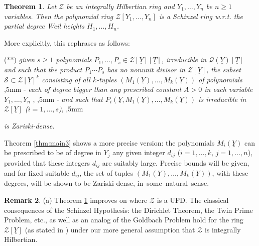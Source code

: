 \documentclass[11pt,a4paper,reqno]{amsart}
\def\Z{\mathbb{Z}}
\newtheorem{thm}{Theorem}[section]
\theoremstyle{definition}
\newtheorem{rmk}[thm]{Remark}
\begin{document}
{\begin{thm} \label{thm:schinzel-main}
Let ${\mathcal Z}$ be an integrally Hilbertian ring and $Y_1,\ldots,Y_n$ be $n\geq 1$ va\-riables. Then the polynomial ring ${\mathcal Z}[Y_1,\ldots,Y_n]$ is a Schinzel ring \hbox{w.r.t.} the partial degree Weil heights $H_1,\ldots,H_n$.   
\end{thm}

More explicitly, this rephrases as follows: 
\vskip 1mm

\noindent
(**) \emph{given $s\geq 1$ polynomials $P_1,\ldots,P_s \in {\mathcal Z}[\underline{Y}][\underline T]$,  irreducible in $\mathcal{Q}(\underline{Y})[\underline T]$
and such that the product $P_1\cdots P_s$ has no nonunit divisor in ${\mathcal Z}[\underline Y]$, the subset ${\mathcal S}\subset {\mathcal Z}[\underline Y]^k$ consisting of all $k$-tuples $(M_1(\underline Y),\ldots,M_k(\underline Y))$ 
of polynomials}
,5mm
- \emph{each of degree bigger than any prescribed constant $A>0$ in each variable $Y_1,\ldots, Y_n$ },
,5mm 
-  \emph{and such that  
$P_i(\underline Y, M_1(\underline Y),\ldots,M_k(\underline Y))$ is irreducible in ${\mathcal Z}[\underline Y]$ ($i=1,\ldots,s$)},
,5mm 


\noindent
\emph{is Zariski-dense.}
\vskip 1mm

Theorem \ref{thm:main3} shows a more precise version: 
the polynomials $M_i(\underline Y)$ can be prescribed  to be of degree in $Y_j$ any given integer $d_{ij}$ ($i=1,\ldots,k$, $j=1,\ldots,n$), provided that these integers $d_{ij}$ are suitably large. Precise bounds will be given, and for fixed suitable $d_{ij}$, the set of tuples $(M_1(\underline Y),\ldots,M_k(\underline Y))$, with these degrees, will be shown to be Zariski-dense, \hbox{in some natural sense.}
\vskip 1mm

\begin{rmk} \label{rmk:schinzel}
(a) Theorem \ref{thm:schinzel-main} improves on \cite[Theorem 1.1]{BDN20b} where ${\mathcal Z}$ is a UFD. The classical consequences of the Schinzel Hypothesis: the Dirichlet Theorem, the Twin Prime Problem, etc., as well as an analog of the Goldbach Problem hold for the ring ${\mathcal Z}[\underline Y]$ (as stated in \cite{BDN20b}) under our more general assumption that ${\mathcal Z}$ is integrally Hilbertian. 
\vskip 1mm



\end{rmk}}
\end{document}

